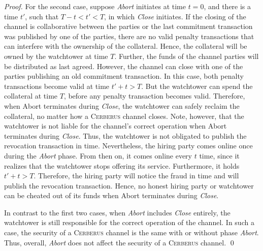 \documentclass[runningheads]{llncs}
\newcommand{\sys}{\textsc{Cerberus}\xspace}
\begin{document}
\begin{proof}
For the second case, suppose \textit{Abort} initiates at time $t=0$, and there is a time $t'$, such that $T-t < t'< T$, in which \textit{Close} initiates.
If the closing of the channel is collaborative between the parties or the last commitment transaction was published by one of the parties, there are no valid penalty transactions that can interfere with the ownership of the collateral. Hence, the collateral will be owned by the watchtower at time $T$.
Further, the funds of the channel parties will be distributed as last agreed.
However, the channel can close with one of the parties publishing an old commitment transaction.
In this case, both penalty transactions become valid at time $t'+t>T$. But the watchtower can spend the collateral at time $T$, before any penalty transaction becomes valid.
Therefore, when {Abort} terminates during \textit{Close}, the watchtower can safely reclaim the collateral, no matter how a \sys channel closes.
Note, however, that the watchtower is not liable for the channel's correct operation when {Abort} terminates during \textit{Close}.
Thus, the watchtower is not obligated to publish the revocation transaction in time.
Nevertheless, the hiring party comes online once during the \textit{Abort} phase. From then on, it comes online every $t$ time, since it realizes that the watchtower stops offering its service. Furthermore, it holds $t'+t>T$.
Therefore, the hiring party will notice the fraud in time and will publish the revocation transaction.
Hence, no honest hiring party or watchtower can be cheated out of its funds when {Abort} terminates during \textit{Close}.


In contrast to the first two cases, when \textit{Abort} includes \textit{Close} entirely, the watchtower is still responsible for the correct operation of the channel.
In such a case, the security of a \sys channel is the same with or without phase \textit{Abort}.
Thus, overall, \textit{Abort} does not affect the security of a \sys channel.
\hfill \qed
\end{proof}
\end{document}
